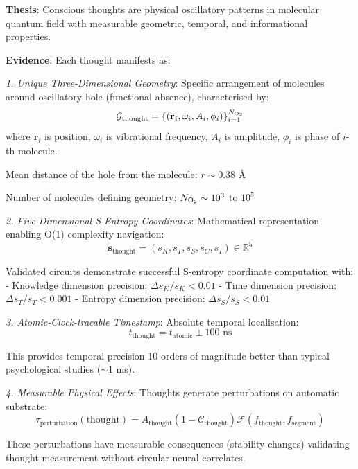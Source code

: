 \documentclass[11pt,onecolumn]{article}
\begin{document}
\textbf{Thesis}: Conscious thoughts are physical oscillatory patterns in  molecular quantum field with measurable geometric, temporal, and informational properties.

\textbf{Evidence}: Each thought manifests as:

\textit{1. Unique Three-Dimensional Geometry}: Specific arrangement of  molecules around oscillatory hole (functional absence), characterised by:
\begin{equation}
\mathcal{G}_{\text{thought}} = \{(\mathbf{r}_i, \omega_i, A_i, \phi_i)\}_{i=1}^{N_{\ce{O2}}}
\end{equation}
where $\mathbf{r}_i$ is position, $\omega_i$ is vibrational frequency, $A_i$ is amplitude, $\phi_i$ is phase of $i$-th  molecule.

Mean distance of the hole from the molecule: $\bar{r} \sim 0.38$ \AA

Number of molecules defining geometry: $N_{\ce{O2}} \sim 10^3$ to $10^5$

\textit{2. Five-Dimensional S-Entropy Coordinates}: Mathematical representation enabling O(1) complexity navigation:
\begin{equation}
\mathbf{s}_{\text{thought}} = (s_K, s_T, s_S, s_C, s_I) \in \mathbb{R}^5
\end{equation}

Validated circuits demonstrate successful S-entropy coordinate computation with:
- Knowledge dimension precision: $\Delta s_K / s_K < 0.01$
- Time dimension precision: $\Delta s_T / s_T < 0.001$  
- Entropy dimension precision: $\Delta s_S / s_S < 0.01$

\textit{3. Atomic-Clock-tracable Timestamp}: Absolute temporal localisation:
\begin{equation}
t_{\text{thought}} = t_{\text{atomic}} \pm 100 \text{ ns}
\end{equation}

This provides temporal precision 10 orders of magnitude better than typical psychological studies ($\sim 1$ ms).

\textit{4. Measurable Physical Effects}: Thoughts generate perturbations on automatic substrate:
\begin{equation}
\tau_{\text{perturbation}}(\text{thought}) = A_{\text{thought}} (1 - \mathcal{C}_{\text{thought}}) \mathcal{F}(f_{\text{thought}}, f_{\text{segment}})
\end{equation}

These perturbations have measurable consequences (stability changes) validating thought measurement without circular neural correlates.
\end{document}

